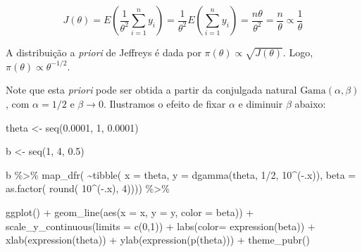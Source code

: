 \documentclass[
]{article}
\newenvironment{Shaded}{\begin{snugshade}}{\end{snugshade}}
\newcommand{\AttributeTok}[1]{\textcolor[rgb]{0.77,0.63,0.00}{#1}}
\newcommand{\DecValTok}[1]{\textcolor[rgb]{0.00,0.00,0.81}{#1}}
\newcommand{\FloatTok}[1]{\textcolor[rgb]{0.00,0.00,0.81}{#1}}
\newcommand{\FunctionTok}[1]{\textcolor[rgb]{0.00,0.00,0.00}{#1}}
\newcommand{\NormalTok}[1]{#1}
\newcommand{\OtherTok}[1]{\textcolor[rgb]{0.56,0.35,0.01}{#1}}
\newcommand{\SpecialCharTok}[1]{\textcolor[rgb]{0.00,0.00,0.00}{#1}}
\begin{document}
\[J(\theta) = E\left(\frac1{\theta^{2}} \sum_{i=1}^n y_i \right) = \frac1{\theta^{2}} E\left( \sum_{i=1}^n y_i \right)  = \frac{n\theta}{\theta^2} = \frac{n}{\theta} \propto \frac 1 \theta\]

A distribuição a \emph{priori} de Jeffreys é dada por
\(\pi(\theta) \propto \sqrt{J(\theta)}\). Logo,
\(\pi(\theta) \propto \theta^{-1/2}\).

Note que esta \emph{priori} pode ser obtida a partir da conjulgada
natural \(\text{Gama}(\alpha, \beta)\), com \(\alpha = 1/2\) e
\(\beta \to 0\). Ilustramos o efeito de fixar \(\alpha\) e diminuir
\(\beta\) abaixo:

\begin{Shaded}
\begin{Highlighting}[]
\NormalTok{theta }\OtherTok{\textless{}{-}} \FunctionTok{seq}\NormalTok{(}\FloatTok{0.0001}\NormalTok{, }\DecValTok{1}\NormalTok{, }\FloatTok{0.0001}\NormalTok{)}

\NormalTok{b }\OtherTok{\textless{}{-}} \FunctionTok{seq}\NormalTok{(}\DecValTok{1}\NormalTok{, }\DecValTok{4}\NormalTok{, }\FloatTok{0.5}\NormalTok{)}

\NormalTok{b }\SpecialCharTok{\%\textgreater{}\%} \FunctionTok{map\_dfr}\NormalTok{( }\SpecialCharTok{\textasciitilde{}}\FunctionTok{tibble}\NormalTok{( }\AttributeTok{x =}\NormalTok{ theta,}
                        \AttributeTok{y =} \FunctionTok{dgamma}\NormalTok{(theta, }\DecValTok{1}\SpecialCharTok{/}\DecValTok{2}\NormalTok{, }\DecValTok{10}\SpecialCharTok{\^{}}\NormalTok{(}\SpecialCharTok{{-}}\NormalTok{.x)),}
                        \AttributeTok{beta =} \FunctionTok{as.factor}\NormalTok{( }\FunctionTok{round}\NormalTok{( }\DecValTok{10}\SpecialCharTok{\^{}}\NormalTok{(}\SpecialCharTok{{-}}\NormalTok{.x), }\DecValTok{4}\NormalTok{)))) }\SpecialCharTok{\%\textgreater{}\%}
  
  \FunctionTok{ggplot}\NormalTok{() }\SpecialCharTok{+} \FunctionTok{geom\_line}\NormalTok{(}\FunctionTok{aes}\NormalTok{(}\AttributeTok{x =}\NormalTok{ x, }\AttributeTok{y =}\NormalTok{ y, }\AttributeTok{color =}\NormalTok{ beta)) }\SpecialCharTok{+}
  \FunctionTok{scale\_y\_continuous}\NormalTok{(}\AttributeTok{limits =} \FunctionTok{c}\NormalTok{(}\DecValTok{0}\NormalTok{,}\DecValTok{1}\NormalTok{)) }\SpecialCharTok{+} \FunctionTok{labs}\NormalTok{(}\AttributeTok{color=} \FunctionTok{expression}\NormalTok{(beta)) }\SpecialCharTok{+}
  \FunctionTok{xlab}\NormalTok{(}\FunctionTok{expression}\NormalTok{(theta)) }\SpecialCharTok{+} \FunctionTok{ylab}\NormalTok{(}\FunctionTok{expression}\NormalTok{(}\FunctionTok{p}\NormalTok{(theta))) }\SpecialCharTok{+}
  \FunctionTok{theme\_pubr}\NormalTok{()}
\end{Highlighting}
\end{Shaded}
\end{document}
